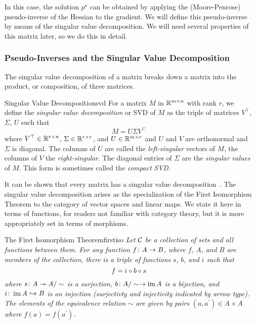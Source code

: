 \documentclass[../../thesis.tex]{subfiles}
\begin{document}
In this case, the solution $p^\star$
can be obtained by applying the
(Moore-Penrose) pseudo-inverse of the Hessian
to the gradient.
We will define this pseudo-inverse
by means of the singular value decomposition.
We will need several properties
of this matrix later,
so we do this in detail.

\subsubsection{Pseudo-Inverses and the Singular Value Decomposition}

The singular value decomposition of a matrix
breaks down a matrix into the product,
or composition, of three matrices.
\begin{definition}{Singular Value Decomposition}{svd}
	For a matrix $M$ in $\mathbb{R}^{m \times n}$
	with rank $r$,
	we define the
	\emph{singular value decomposition} or SVD of $M$
	as the triple of matrices $V^\top$, $\Sigma$, $U$
	such that
	\begin{equation}
		M = U \Sigma V^\top
	\end{equation}
	where $V^\top \in \mathbb{R}^{r \times n}$,
	$\Sigma \in \mathbb{R}^{r \times r}$, and
	$U \in \mathbb{R}^{m \times r}$
	and $U$ and $V$ are orthonormal
	and $\Sigma$ is diagonal.
	The columns of $U$ are called the \emph{left-singular}
	vectors of $M$, the columns of $V$ the \emph{right-singular}.
	The diagonal entries of $\Sigma$ are the \emph{singular values} of $M$.
	This form is sometimes called the \emph{compact SVD}.
\end{definition}

It can be shown that every matrix has a
singular value decomposition~\cite{strang1993}.
The singular value decomposition arises
as the specialization of the First Isomorphism Theorem
to the category of vector spaces and linear maps.
We state it here in terms of functions,
for readers not familiar with category theory,
but it is more appropriately set in terms of morphisms.

\begin{theorem}{The First Isomorphism Theorem}{firstiso}
	\emph{Let ${\mathcal{C}}$ be a collection of sets and all functions between them.
	For any function $f\colon A \to B$, where $f$, $A$, and $B$ are members of the collection,
	there is a triple of functions $s$, $b$, and $i$ such that
	\begin{equation}
	      f = i \circ b \circ s
	\end{equation}
	where $s\colon A \twoheadrightarrow A/\sim$ is a surjection,
	$b\colon A/\sim \to \operatorname*{im} A$ is a bijection, and
	$i\colon \operatorname*{im} A \hookrightarrow B$ is an injection
	(surjectivty and injectivity indicated by arrow type).
	The elements of the equivalence relation $\sim$
	are given by pairs $(a, a^\prime) \in A \times A$
	where $f(a) = f(a^\prime)$.}
\end{theorem}
\end{document}
